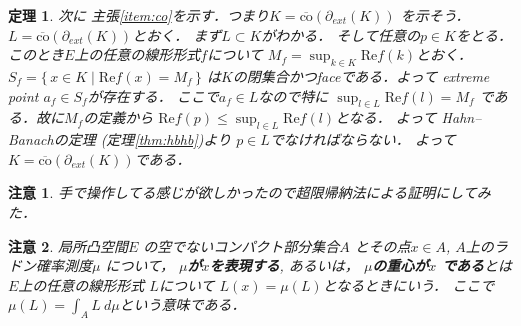 \documentclass[leqno, a4paper, 12pt]{jsarticle}
\newtheorem{thm}{定理}
\newtheorem*{rmk}{注意}
\newcommand{\myre}{\mathrm{Re}}
\newcommand{\myextreme}[1]{\partial_{ext}(#1)}
\newcommand{\mycco}[1]{\overline{\mathrm{co}}(#1)}
\begin{document}
\begin{thm}
次に
主張\ref{item:co}を示す．つまり$K=\mycco{\myextreme{K}}$
を示そう．$L=\mycco{\myextreme{K}}$とおく．
まず$L\subset K$がわかる．
そして任意の$p\in K$をとる．
このとき$E$上の任意の線形形式$f$について
$M_{f}=\sup_{k\in K}\myre f(k)$とおく．
$S_{f}=\{\, x\in K\mid \myre f(x)=M_{f}\, \}$
は$K$の閉集合かつfaceである．よって
extreme point $a_{f}\in S_{f}$が存在する．
ここで$a_{f}\in L$なので特に
$\sup_{l\in L}\myre f(l)= M_{f}$
である．故に$M_{f}$の定義から
$\myre f(p)\le \sup_{l\in L}\myre f(l)$となる．
よって
Hahn--Banachの定理
(定理\ref{thm:hbhb})より
$p\in L$でなければならない．
よって
$K=\mycco{\myextreme{K}}$である．
\end{thm}
\begin{rmk}
手で操作してる感じが欲しかったので超限帰納法による証明にしてみた．
\end{rmk}


\begin{rmk}
局所凸空間$E$
の空でないコンパクト部分集合$A$
とその点$x\in A$, 
$A$上のラドン確率測度$\mu$
について，
\textbf{$\mu$が$x$を表現する}, あるいは，
\textbf{$\mu$の重心が$x$
である}とは
$E$上の任意の線形形式
$L$について
$L(x)=\mu(L)$となるときにいう．
ここで$\mu(L)=\int_{A}L\ d\mu$という意味である．
\end{rmk}
\end{document}
